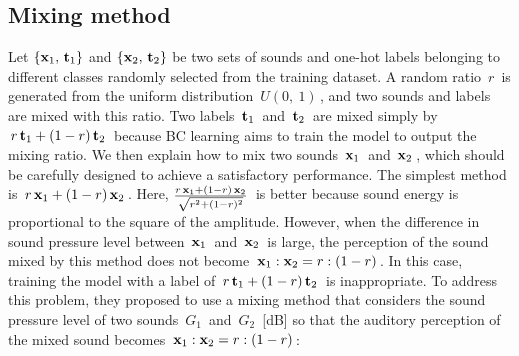 \documentclass[10pt,twocolumn,letterpaper]{article}
\begin{document}
\subsection{Mixing method}\label{mixsound}
Let $\{{\bf x}_1,\, {\bf t}_1\}$ and $\{{\bf x}_2,\, {\bf t}_2\}$ be two sets of sounds and one-hot labels belonging to different classes randomly selected from the training dataset. A random ratio $\, r \,$ is generated from the uniform distribution $\, U(0,\ 1) \,$, and two sounds and labels are mixed with this ratio. Two labels $\, {\bf t}_1\, $ and $\, {\bf t}_2 \,$ are mixed simply by $\, r \, {\bf t}_1 + (1-r) \, {\bf t}_2 \,$ because BC learning aims to train the model to output the mixing ratio. We then explain how to mix two sounds $\, {\bf x}_1 \,$ and $\, {\bf x}_2 \,$, which should be carefully designed to achieve a satisfactory performance. The simplest method is $\, r \, {\bf x}_1 + (1-r) \, {\bf x}_2 \,$. Here, $\frac{r \, {\bf x}_1 + (1-r) \, {\bf x}_2}{\sqrt{r^2 + (1-r)^2}}\,$ is better because sound energy is proportional to the square of the amplitude. However, when the difference in sound pressure level between $\, {\bf x}_1 \,$ and $\, {\bf x}_2 \,$ is large, the perception of the sound mixed by this method does not become $\, {\bf x}_1:{\bf x}_2=r:(1-r) \,$. In this case, training the model with a label of $\, r \, {\bf t}_1 + (1-r) \, {\bf t}_2 \,$ is inappropriate. To address this problem, they proposed to use a mixing method that considers the sound pressure level of two sounds $\, G_1 \,$ and $\, G_2 \,$ [dB] so that the auditory perception of the mixed sound becomes $\, {\bf x}_1:{\bf x}_2=r:(1-r) \,$:
\end{document}
